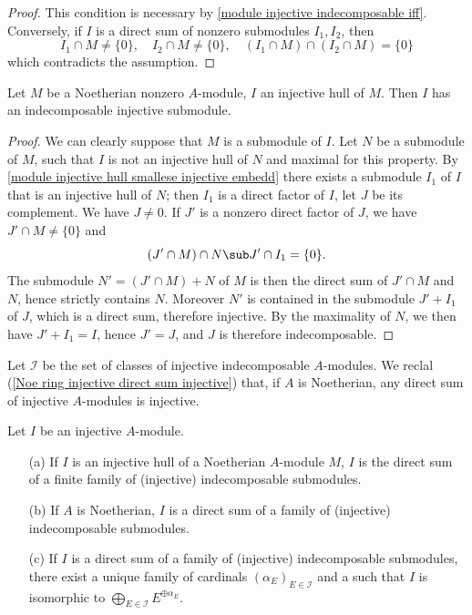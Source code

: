 \begin{proof}
This condition is necessary by \cref{module injective indecomposable iff}. Conversely, if $I$ is a direct sum of nonzero submodules $I_1,I_2$, then
\[I_1\cap M\neq\{0\},\quad I_2\cap M\neq\{0\},\quad (I_1\cap M)\cap(I_2\cap M)=\{0\}\]
which contradicts the assumption.
\end{proof}
\begin{lemma}\label{Noe module injective hull has indecomposable}
Let $M$ be a Noetherian nonzero $A$-module, $I$ an injective hull of $M$. Then $I$ has an indecomposable injective submodule.
\end{lemma}
\begin{proof}
We can clearly suppose that $M$ is a submodule of $I$. Let $N$ be a submodule of $M$, such that $I$ is not an injective hull of $N$ and maximal for this property. By \cref{module injective hull smallese injective embedd} there exists a submodule $I_1$ of $I$ that is an injective hull of $N$; then $I_1$ is a direct factor of $I$, let $J$ be its complement. We have $J\neq 0$. If $J'$ is a nonzero direct factor of $J$, we have $J'\cap M\neq\{0\}$ and
\[(J'\cap M)\cap N\sub J'\cap I_1=\{0\}.\]
The submodule $N'=(J'\cap M)+N$ of $M$ is then the direct sum of $J'\cap M$ and $N$, hence strictly contains $N$. Moreover $N'$ is contained in the submodule $J'+I_1$ of $J$, which is a direct sum, therefore injective. By the maximality of $N$, we then have $J'+I_1=I$, hence $J'=J$, and $J$ is therefore indecomposable.
\end{proof}
Let $\mathscr{I}$ be the set of classes of injective indecomposable $A$-modules. We reclal (\cref{Noe ring injective direct sum injective}) that, if $A$ is Noetherian, any direct sum of injective $A$-modules is injective.
\begin{theorem}\label{module injective direct sum of indecomposable}
Let $I$ be an injective $A$-module.
\begin{itemize}
\item[(a)] If $I$ is an injective hull of a Noetherian $A$-module $M$, $I$ is the direct sum of a finite family of (injective) indecomposable  submodules.
\item[(b)] If $A$ is Noetherian, $I$ is a direct sum of a family of (injective) indecomposable submodules.
\item[(c)] If $I$ is a direct sum of a family of (injective) indecomposable submodules, there exist a unique family of cardinals $(\alpha_E)_{E\in\mathscr{I}}$ and a such that $I$ is isomorphic to $\bigoplus_{E\in\mathscr{I}}E^{\oplus\alpha_E}$.
\end{itemize}
\end{theorem}
